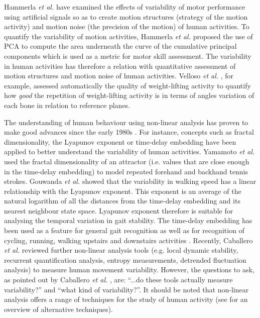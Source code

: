 \documentclass[10pt,journal,compsoc]{IEEEtran}
\begin{document}
Hammerla \textit{et al.} \cite{hammerla2011} have examined the effects of
variability of motor performance using artificial signals so as 
to create motion structures (strategy of the motion activity) 
and motion noise (the precision of the motion) of human 
activities. To quantify the variability of motion activities, 
Hammerla \textit{et al.} \cite{hammerla2011} proposed the use of PCA to compute 
the area underneath the curve of the cumulative principal 
components which is used as a metric for motor skill assessment.
The variability in human activities has therefore 
a relation with quantitative assessment of motion structures 
and motion noise of human activities. 
Velloso \textit{et al.} \cite{Velloso2013a, Velloso2013b},
for example, assessed automatically the quality of weight-lifting 
activity to quantify how \textit{good} the repetition of 
weight-lifting activity is in terms of angles variation of each bone 
in relation to reference planes. 

The understanding of human behaviour using non-linear 
analysis has proven to make good advances since the early 1980s 
\cite{Huys2011, KantzSchreiber04}. For instance, concepts such as fractal 
dimensionality, the Lyapunov exponent or time-delay 
embedding have been applied to better understand the 
variability of human activities. Yamamoto \textit{et al.} \cite{Suzuki2013, Yamamoto2000} 
used the fractal dimensionality of an attractor 
(i.e. values that are close enough in the time-delay embedding)
to model repeated forehand and backhand tennis strokes.
Gouwanda \textit{et al.} \cite{Gouwanda2012} showed that the variability in walking 
speed has a linear relationship with the Lyapunov exponent. 
This exponent is an average of the natural logarithm of all 
the distances from the time-delay embedding and its nearest 
neighbour state space. Lyapunov exponent therefore is suitable
for analysing the temporal variation in gait stability.
The time-delay embedding has been used as a feature for 
general gait recognition \cite{Sama2013} as well as for recognition 
of cycling, running, walking upstairs and downstairs activities \cite{Frank2010}.
Recently,  Caballero \textit{et al.} \cite{Caballero2014} reviewed further non-linear 
analysis tools (e.g. local dynamic stability, recurrent quantification analysis, 
entropy measurements, detrended fluctuation analysis) to measure human movement 
variability.  However, the questions to ask, as pointed out by 
Caballero \textit{et al.} \cite{Caballero2014}, are: ``...do these tools actually 
measure variability?'' and ``what kind of variability?''.
It should be noted that non-linear analysis offers a range of techniques 
for the study of human activity (see \cite{Guastello2011} 
for an overview of alternative techniques). 
\end{document}
